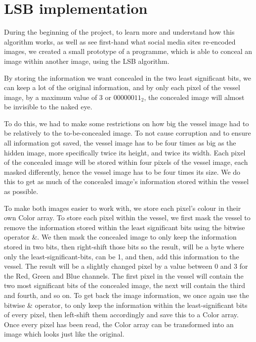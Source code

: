 \section{LSB implementation}
\label{sec:lsb-implementation}
During the beginning of the project, to learn more and understand how this algorithm works, as well as see first-hand what social media sites re-encoded images, we created a small prototype of a programme, which is able to conceal an image within another image, using the LSB algorithm. 

By storing the information we want concealed in the two least significant bits, we can keep a lot of the original information, and by only each pixel of the vessel image, by a maximum value of 3 or $00000011_2$, the concealed image will almost be invisible to the naked eye.

To do this, we had to make some restrictions on how big the vessel image had to be relatively to the to-be-concealed image. To not cause corruption and to ensure all information got saved, the vessel image has to be four times as big as the hidden image, more specifically twice its height, and twice its width. Each pixel of the concealed image will be stored within four pixels of the vessel image, each masked differently, hence the vessel image has to be four times its size. We do this to get as much of the concealed image's information stored within the vessel as possible.

To make both images easier to work with, we store each pixel's colour in their own Color array. To store each pixel within the vessel, we first mask the vessel to remove the information stored within the least significant bits using the bitwise operator \&. We then mask the concealed image to only keep the information stored in two bits, then right-shift those bits so the result, will be a byte where only the least-significant-bits, can be 1, and then, add this information to the vessel. The result will be a slightly changed pixel by a value between 0 and 3 for the Red, Green and Blue channels. The first pixel in the vessel will contain the two most significant bits of the concealed image, the next will contain the third and fourth, and so on. To get back the image information, we once again use the bitwise \& operator, to only keep the information within the least-significant bits of every pixel, then left-shift them accordingly and save this to a Color array. Once every pixel has been read, the Color array can be transformed into an image which looks just like the original.


